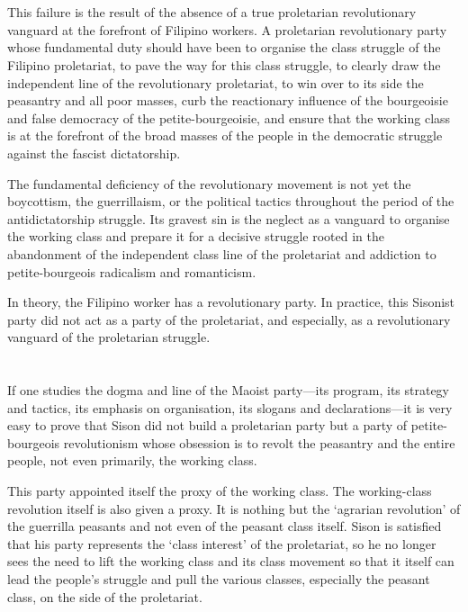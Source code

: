 \section{}
This failure 
is the result 
of the absence 
of a true proletarian revolutionary vanguard
at the forefront of Filipino workers.
A proletarian revolutionary party whose fundamental duty should have been
to organise the class struggle of the Filipino proletariat, 
to pave the way for this class struggle, 
to clearly draw the independent line of the revolutionary proletariat, 
to win over to its side the peasantry and all poor masses, 
curb the reactionary influence of the bourgeoisie 
and false democracy of the petite-bourgeoisie, 
and ensure that the working class 
is at the forefront of the broad masses of the people 
in the democratic struggle against the fascist dictatorship.

The fundamental deficiency of the revolutionary movement 
is not yet the boycottism, 
the guerrillaism, 
or the political tactics 
throughout the period of the antidictatorship struggle. 
Its gravest sin 
is the neglect as a vanguard 
to organise the working class 
and prepare it for a decisive struggle 
rooted in the abandonment of the independent class line of the proletariat
and addiction to petite-bourgeois radicalism and romanticism.

In theory,
the Filipino worker has a revolutionary party.
In practice,
this Sisonist party 
did not act as a party of the proletariat,
and especially,
as a revolutionary vanguard of the proletarian struggle.


\section{}
If one studies the dogma and line of the Maoist party---its program, 
its strategy and tactics, 
its emphasis on organisation, 
its slogans and declarations---it 
is very easy to prove that Sison 
did not build a proletarian party 
but a party of petite-bourgeois revolutionism 
whose obsession is to revolt the peasantry and the entire people, 
not even primarily, the working class.

This party appointed itself the proxy of the working class. 
The working-class revolution itself is also given a proxy. 
It is nothing but the `agrarian revolution' 
of the guerrilla peasants 
and not even of the peasant class itself. 
Sison is satisfied that his party represents 
the `class interest' of the proletariat, 
so he no longer sees the need to lift 
the working class and its class movement 
so that it itself can lead the people's struggle 
and pull the various classes, 
especially the peasant class, 
on the side of the proletariat.

